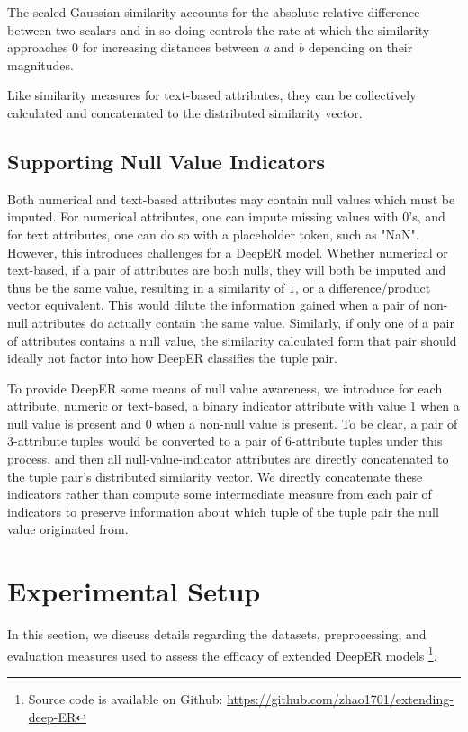 \documentclass{proc}
\begin{document}
The scaled Gaussian similarity accounts for the absolute relative difference between two scalars and in so doing controls the rate at which the similarity approaches $0$ for increasing distances between $a$ and $b$ depending on their magnitudes.

Like similarity measures for text-based attributes, they can be collectively calculated and concatenated to the distributed similarity vector.

\subsection{Supporting Null Value Indicators}

Both numerical and text-based attributes may contain null values which must be imputed. For numerical attributes, one can impute missing values with $0$'s, and for text attributes, one can do so with a placeholder token, such as "NaN". However, this introduces challenges for a DeepER model. Whether numerical or text-based, if a pair of attributes are both nulls, they will both be imputed and thus be the same value, resulting in a similarity of $1$, or a difference/product vector equivalent. This would dilute the information gained when a pair of non-null attributes do actually contain the same value. Similarly, if only one of a pair of attributes contains a null value, the similarity calculated form that pair should ideally not factor into how DeepER classifies the tuple pair.

To provide DeepER some means of null value awareness, we introduce for each attribute, numeric or text-based, a binary indicator attribute with value $1$ when a null value is present and $0$ when a non-null value is present. To be clear, a pair of 3-attribute tuples would be converted to a pair of 6-attribute tuples under this process, and then all null-value-indicator attributes are directly concatenated to the tuple pair's distributed similarity vector. We directly concatenate these indicators rather than compute some intermediate measure from each pair of indicators to preserve information about which tuple of the tuple pair the null value originated from.

\section{Experimental Setup}

In this section, we discuss details regarding the datasets, preprocessing, and evaluation measures used to assess the efficacy of extended DeepER models \footnote{Source code is available on Github: \url{https://github.com/zhao1701/extending-deep-ER}}.
\end{document}

